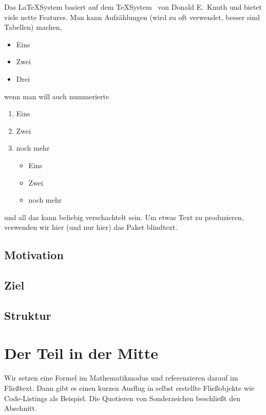 \documentclass[11pt,a4paper]{article} %
\begin{document}
Das \LaTeX\-System basiert auf dem 
\TeX\-System~\cite{knuth} %
von Donald E.~Knuth %
und bietet viele nette Features.
Man kann Aufzählungen (wird zu oft verwendet, besser sind Tabellen)
machen,
\begin{itemize}
\item Eins
\item Zwei
\item Drei
\end{itemize}
wenn man will auch nummerierte
\begin{enumerate}
\item Eins
\item Zwei
\item noch mehr
\begin{itemize}
\item Eins
\item Zwei
\item noch mehr
\end{itemize}
\end{enumerate}
und all das kann beliebig verschachtelt sein.
Um etwas Text zu produzieren, verwenden wir hier
(und nur hier) das Paket \textsf{blindtext}.

\Blindtext[1] %

\subsection{Motivation}
\Blindtext[2] %

\subsection{Ziel}
\Blindtext[2]

\subsection{Struktur}
\Blindtext[2]


\section{Der Teil in der Mitte} \label{sec:mittelteil}

Wir setzen eine Formel im Mathematikmodus und referenzieren darauf
im Fließtext.
Dann gibt es einen kurzen Ausflug in selbst erstellte Fließobjekte
wie Code-Listings als Beispiel.
Die Quotieren von Sonderzeichen beschließt den Abschnitt.
\end{document}
